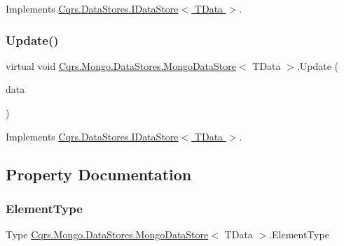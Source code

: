 Implements \hyperlink{interfaceCqrs_1_1DataStores_1_1IDataStore_aead8d7a39a717d29af05daf7b64bea94}{Cqrs.\+Data\+Stores.\+I\+Data\+Store$<$ T\+Data $>$}.

\mbox{\label{classCqrs_1_1Mongo_1_1DataStores_1_1MongoDataStore_a03aac0495445d34f124db893cd09cbd8}} 
\subsubsection{\texorpdfstring{Update()}{Update()}}
{\footnotesize\ttfamily virtual void \hyperlink{classCqrs_1_1Mongo_1_1DataStores_1_1MongoDataStore}{Cqrs.\+Mongo.\+Data\+Stores.\+Mongo\+Data\+Store}$<$ T\+Data $>$.Update (\begin{DoxyParamCaption}\item[{T\+Data}]{data }\end{DoxyParamCaption})\hspace{0.3cm}{\ttfamily [virtual]}}



Implements \hyperlink{interfaceCqrs_1_1DataStores_1_1IDataStore_a6d5d4dd572de8db01ff0c48d37faefa7}{Cqrs.\+Data\+Stores.\+I\+Data\+Store$<$ T\+Data $>$}.



\subsection{Property Documentation}
\mbox{\label{classCqrs_1_1Mongo_1_1DataStores_1_1MongoDataStore_a0b55d9ca4d8ac206dd7beec30aa123df}} 
\subsubsection{\texorpdfstring{Element\+Type}{ElementType}}
{\footnotesize\ttfamily Type \hyperlink{classCqrs_1_1Mongo_1_1DataStores_1_1MongoDataStore}{Cqrs.\+Mongo.\+Data\+Stores.\+Mongo\+Data\+Store}$<$ T\+Data $>$.Element\+Type\hspace{0.3cm}{\ttfamily [get]}}



